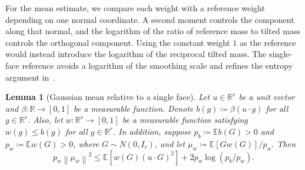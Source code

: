 \documentclass[11pt,letterpaper,twoside,leqno]{article}
\theoremstyle{bookplain}
\newtheorem{lemma}{Lemma}
\theoremstyle{bookremark}
\newcommand{\E}{\mathbb E}
\newcommand{\R}{\mathbb R}
\newcommand{\norm}[1]{\left\lVert#1\right\rVert}
\begin{document}
For the mean estimate, we compare each weight with a reference weight
depending on one normal coordinate. A second moment controls the
component along that normal, and the logarithm of the ratio of
reference mass to tilted mass controls the orthogonal component.
Using the constant weight \(1\) as the reference would instead introduce
the logarithm of the reciprocal tilted mass. The single-face reference
avoids a logarithm of the smoothing scale and refines the entropy argument
in~\cite[Lemma~12]{GaoZhang}.

\begin{lemma}[Gaussian mean relative to a single face]
\label{appx-an:lem:mean}
Let \(u\in\R^r\) be a unit vector and
\(\beta:\R\to[0,1]\) be a measurable function. Denote
\(b(g)\coloneqq\beta(u\cdot g)\) for all \(g\in\R^r\).
Also, let \(w:\R^r\to[0,1]\) be a measurable function
satisfying \(w(g)\le b(g)\) for all $g\in\R^r$.
In addition, suppose \(p_b\coloneqq\E b(G)>0\) and
\(p_w\coloneqq\E w(G)>0\), where \(G\sim N(0,I_r)\),
and let \(\mu_w\coloneqq\E[Gw(G)]/p_w\). Then
\begin{equation}
 p_w\norm{\mu_w}^2
 \le \E[w(G)(u\cdot G)^2]
        +2p_w\log(p_b/p_w).
 \label{appx-an:mean-entropy}
\end{equation}
\end{lemma}
\end{document}
